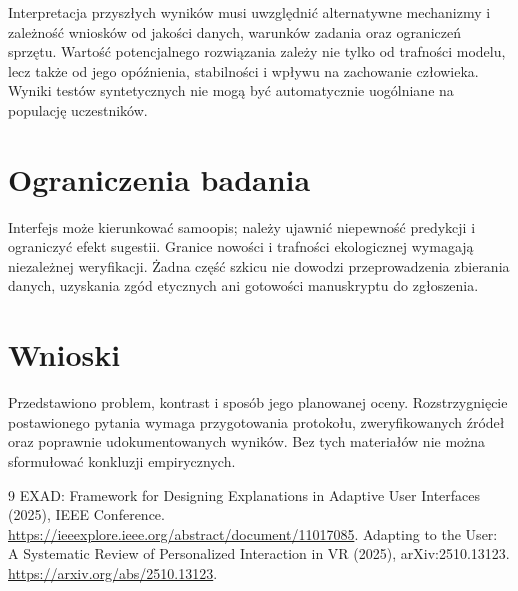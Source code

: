 \documentclass[11pt,a4paper]{article}
\begin{document}
Interpretacja przyszłych wyników musi uwzględnić alternatywne mechanizmy i zależność wniosków od jakości danych, warunków zadania oraz ograniczeń sprzętu. Wartość potencjalnego rozwiązania zależy nie tylko od trafności modelu, lecz także od jego opóźnienia, stabilności i wpływu na zachowanie człowieka. Wyniki testów syntetycznych nie mogą być automatycznie uogólniane na populację uczestników.

\section{Ograniczenia badania}

Interfejs może kierunkować samoopis; należy ujawnić niepewność predykcji i ograniczyć efekt sugestii. Granice nowości i trafności ekologicznej wymagają niezależnej weryfikacji. Żadna część szkicu nie dowodzi przeprowadzenia zbierania danych, uzyskania zgód etycznych ani gotowości manuskryptu do zgłoszenia.

\section{Wnioski}

Przedstawiono problem, kontrast i sposób jego planowanej oceny. Rozstrzygnięcie postawionego pytania wymaga przygotowania protokołu, zweryfikowanych źródeł oraz poprawnie udokumentowanych wyników. Bez tych materiałów nie można sformułować konkluzji empirycznych.

\begin{thebibliography}{9}
 EXAD: Framework for Designing Explanations in Adaptive User Interfaces (2025), IEEE Conference. \url{https://ieeexplore.ieee.org/abstract/document/11017085}.
 Adapting to the User: A Systematic Review of Personalized Interaction in VR (2025), arXiv:2510.13123. \url{https://arxiv.org/abs/2510.13123}.
\end{thebibliography}
\end{document}
